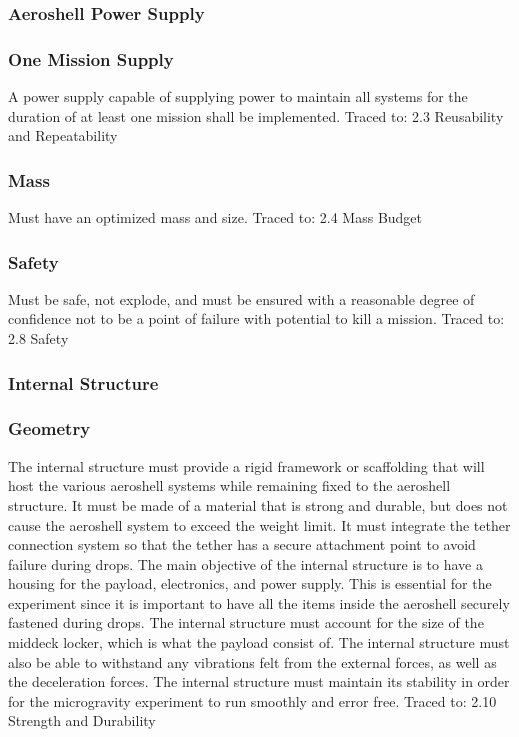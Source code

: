 \subsubsection{Aeroshell Power Supply}

\subsubsection*{One Mission Supply}
\indent\indent A power supply capable of supplying power to maintain all systems for the duration of at least one mission shall be implemented. Traced to: 2.3 Reusability and Repeatability

\subsubsection*{Mass}
\indent\indent Must have an optimized mass and size. Traced to: 2.4 Mass Budget

\subsubsection*{Safety}
\indent\indent Must be safe, not explode, and must be ensured with a reasonable degree of confidence not to be a point of failure with potential to kill a mission. Traced to: 2.8 Safety

\subsubsection{Internal Structure}

\subsubsection*{Geometry}
\indent\indent The internal structure must provide a rigid framework or scaffolding that will host the various aeroshell systems while remaining fixed to the aeroshell structure. It must be made of a material that is strong and durable, but does not cause the aeroshell system to exceed the weight limit. It must integrate the tether connection system so that the tether has a secure attachment point to avoid failure during drops. The main objective of the internal structure is to have a housing for the payload, electronics, and power supply. This is essential for the experiment since it is important to have all the items inside the aeroshell securely fastened during drops. The internal structure must account for the size of the middeck locker, which is what the payload consist of. The internal structure must also be able to withstand any vibrations felt from the external forces, as well as the deceleration forces. The internal structure must maintain its stability in order for the microgravity experiment to run smoothly and error free. Traced to: 2.10 Strength and Durability


